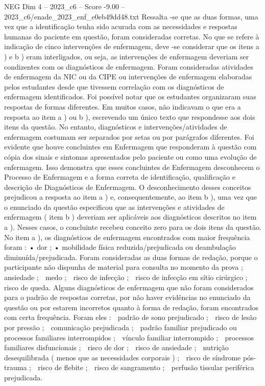 \begin{textsample}{NEG Dim 4 – 2023\_c6 – Score -9.00 – 2023\_c6/enade\_2023\_enf\_e0eb49dd48.txt}
Ressalta -se que as duas formas, uma vez que a identificação tenha sido acurada com as necessidades e respostas humanas do paciente em questão, foram consideradas corretas.
No que se refere à indicação de cinco intervenções de enfermagem, deve -se considerar que os itens a ) e b ) eram interligados, ou seja, as intervenções de enfermagem deveriam ser condizentes com os diagnósticos de enfermagem.
Foram consideradas atividades de enfermagem da NIC ou da CIPE ou intervenções de enfermagem elaboradas pelos estudantes desde que tivessem correlação com os diagnósticos de enfermagem identificados.
Foi possível notar que os estudantes organizaram suas respostas de formas diferentes.
Em muitos casos, não indicavam o que era a resposta ao item a ) ou b ), escrevendo um único texto que respondesse aos dois itens da questão.
No entanto, diagnósticos e intervenções/atividades de enfermagem costumam ser separados por setas ou por parágrafos diferentes.
Foi evidente que houve concluintes em Enfermagem que responderam à questão com cópia dos sinais e sintomas apresentados pelo paciente ou como uma evolução de enfermagem.
Isso demonstra que esses concluintes de Enfermagem desconhecem o Processo de Enfermagem e a forma correta de identificação, qualificação e descrição de Diagnósticos de Enfermagem.
O desconhecimento desses conceitos prejudicou a resposta ao item a ) e, consequentemente, ao item b ), uma vez que o enunciado da questão especificou que as intervenções e atividades de enfermagem ( item b ) deveriam ser aplicáveis aos diagnósticos descritos no item a ).
Nesses casos, o concluinte recebeu conceito zero para os dois itens da questão.
No item a ), os diagnósticos de enfermagem encontrados com maior frequência foram : • dor ; • mobilidade física reduzida/prejudicada ou deambulação diminuída/prejudicada.
Foram consideradas as duas formas de redação, porque o participante não dispunha de material para consulta no momento da prova ;  ansiedade ;  medo ;  risco de infecção ;  risco de infecção em sítio cirúrgico ;  risco de queda.
Alguns diagnósticos de enfermagem que não foram considerados para o padrão de respostas corretas, por não haver evidências no enunciado da questão ou por estarem incorretos quanto à forma de redação, foram encontrados com certa frequência.
Foram eles :  padrão de sono prejudicado ;  risco de lesão por pressão ;  comunicação prejudicada ;  padrão familiar prejudicado ou processos familiares interrompidos ;  vínculo familiar interrompido ;  processos familiares disfuncionais ;  risco de dor ;  risco de ansiedade ;  nutrição desequilibrada ( menos que as necessidades corporais ) ;  risco de síndrome pós-trauma ;  risco de flebite ;  risco de sangramento ;  perfusão tissular periférica prejudicada.

\end{textsample}
